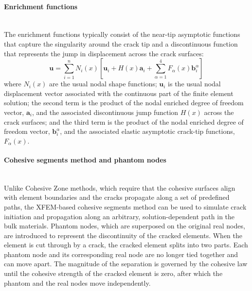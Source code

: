 \documentclass[preprint,review,12pt]{elsarticle}
\begin{document}
\paragraph{Enrichment functions}
\
\\
The enrichment functions typically consist of the near-tip asymptotic functions that capture the singularity around the crack tip and a discontinuous function that represents the jump in displacement across the crack surfaces:
\begin{equation}\label{enrich}
    \mathbf{u}=\sum_{i=1}^{n}N_i(x)[\mathbf{u}_i+H(x)\mathbf{a}_i+\sum_{\alpha=1}^{4}F_\alpha(x)\mathbf{b}_i^{\alpha}]
\end{equation}
where $N_i(x)$  are the usual nodal shape functions; $\mathbf{u}_i$ is the usual nodal displacement vector associated with the continuous part of the finite element solution; the second term is the product of the nodal enriched degree of freedom vector, $\mathbf{a}_i$, and the associated discontinuous jump function   $H(x)$ across the crack surfaces; and the third term is the product of the nodal enriched degree of freedom vector, $\mathbf{b}_i^{\alpha}$, and the associated elastic asymptotic crack-tip functions, $F_\alpha(x)$.

\paragraph{Cohesive segments method and phantom nodes}
\
\\
Unlike Cohesive Zone methods, which require that the cohesive surfaces align with element boundaries and the cracks propagate along a set of predefined paths, the XFEM-based cohesive segments method can be used to simulate crack initiation and propagation along an arbitrary, solution-dependent path in the bulk materials. Phantom nodes, which are superposed on the original real nodes, are introduced to represent the discontinuity of the cracked elements. When the element is cut through by a crack, the cracked element splits into two parts. Each phantom node and its corresponding real node are no longer tied together and can move apart.
The magnitude of the separation is governed by the cohesive law until the cohesive strength of the cracked element is zero, after which the phantom and the real nodes move independently.
\end{document}
